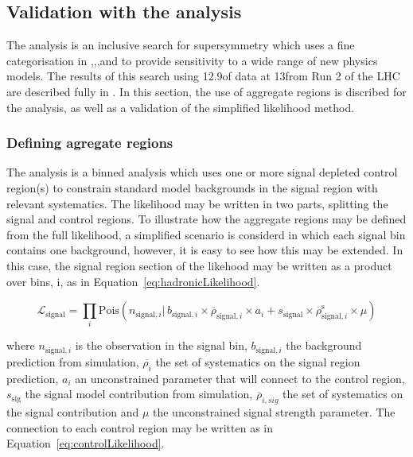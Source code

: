 \subsection{Validation with the \alphat analysis}
The \alphat analysis is an inclusive search for supersymmetry which
uses a fine categorisation in \nj,\nb,\scalht,and \mht to provide
sensitivity to a wide range of new physics models. The results 
of this search using 12.9\fb of data at 13\TeV from Run 2 of the LHC
are described fully in \cite{CMS-PAS-SUS-16-016}. In this section,
the use of aggregate regions is discribed for the \alphat analysis, as well as a 
validation of the simplified likelihood method.

\subsubsection{Defining agregate regions}

The \alphat analysis is a binned analysis which uses one or more signal depleted control region(s) 
to constrain standard model backgrounds in the signal region with relevant systematics.
The likelihood may be written in two parts, splitting the signal and control regions. 
To illustrate how the aggregate regions may be defined from the full likelihood, 
a simplified scenario is considerd in which each signal bin contains one background, however,
it is easy to see how this may be extended. In this case, the signal region section of the likehood may be written
as a product over bins, i, as in Equation~\ref{eq:hadronicLikelihood}.

\begin{equation}
\mathcal{L}_{\mathrm{signal}}=\prod_i{\mathrm{Pois}(n_{\mathrm{signal},i} |\, b_{\mathrm{signal},i}
\times\overline{\rho}_{\mathrm{signal},i}\times{a_i} + s_{\mathrm{signal}}\times\overline{\rho}^\mathrm{s}_{\mathrm{signal},i}\times\mu)}
\label{eq:hadronicLikelihood}
\end{equation}

where $n_{\mathrm{signal},i}$ is the observation in the signal bin, $b_{\mathrm{signal},i}$
the background prediction from simulation, $\overline{\rho_{i}}$ the set of systematics
on the signal region prediction, ${a_i}$ an unconstrained parameter that will connect to the 
control region, $s_{\mathrm{sig}}$ the signal model contribution from simulation, 
$\overline{\rho}_{i,sig}$ the set of systematics on the signal contribution and $\mu$ the
unconstrained signal strength parameter.  The connection to each control region 
may be written as in Equation~\ref{eq:controlLikelihood}.

